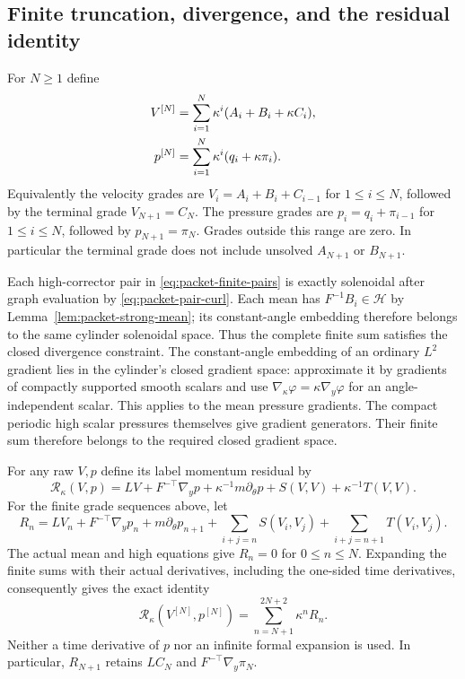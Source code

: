 \subsection{Finite truncation, divergence, and the residual identity}
For $N\ge1$ define
\begin{align}
 V^{[N]}&=\sum_{i=1}^N\kappa^i(A_i+B_i+\kappa C_i),\notag\\
 p^{[N]}&=\sum_{i=1}^N\kappa^i(q_i+\kappa\pi_i).
                                                        \label{eq:packet-finite-pairs}
\end{align}
Equivalently the velocity grades are $V_i=A_i+B_i+C_{i-1}$ for
$1\le i\le N$, followed by the terminal grade $V_{N+1}=C_N$.
The pressure grades are $p_i=q_i+\pi_{i-1}$ for $1\le i\le N$,
followed by $p_{N+1}=\pi_N$. Grades outside this range are zero.
In particular the terminal grade does not include unsolved
$A_{N+1}$ or $B_{N+1}$.

Each high-corrector pair in \eqref{eq:packet-finite-pairs} is exactly
solenoidal after graph evaluation by \eqref{eq:packet-pair-curl}.
Each mean has $F^{-1}B_i\in\mathcal H$ by
Lemma~\ref{lem:packet-strong-mean}; its constant-angle embedding therefore
belongs to the same cylinder solenoidal space. Thus the complete finite
sum satisfies the closed divergence constraint. The constant-angle
embedding of an ordinary $L^2$ gradient lies in the cylinder's closed
gradient space: approximate it by gradients of compactly supported
smooth scalars and use $\nabla_\kappa\varphi=\kappa\nabla_y\varphi$
for an angle-independent scalar. This applies to the mean pressure
gradients. The compact periodic high scalar pressures themselves give
gradient generators. Their finite sum therefore belongs to the required
closed gradient space.

For any raw $V,p$ define its label momentum residual by
\begin{equation}\label{eq:packet-raw-residual}
 \mathcal R_\kappa(V,p)=LV+F^{-\top}\nabla_yp+
 \kappa^{-1}m\partial_\theta p+S(V,V)+\kappa^{-1}T(V,V).
\end{equation}
For the finite grade sequences above, let
\[
 R_n=LV_n+F^{-\top}\nabla_yp_n+m\partial_\theta p_{n+1}
       +\sum_{i+j=n}S(V_i,V_j)+\sum_{i+j=n+1}T(V_i,V_j).
\]
The actual mean and high equations give $R_n=0$ for $0\le n\le N$.
Expanding the finite sums with their actual derivatives, including the
one-sided time derivatives, consequently gives the exact identity
\begin{equation}\label{eq:packet-tail-identity}
 \mathcal R_\kappa(V^{[N]},p^{[N]})
   =\sum_{n=N+1}^{2N+2}\kappa^nR_n.
\end{equation}
Neither a time derivative of $p$ nor an infinite formal expansion is used.
In particular, $R_{N+1}$ retains $LC_N$ and
$F^{-\top}\nabla_y\pi_N$.

